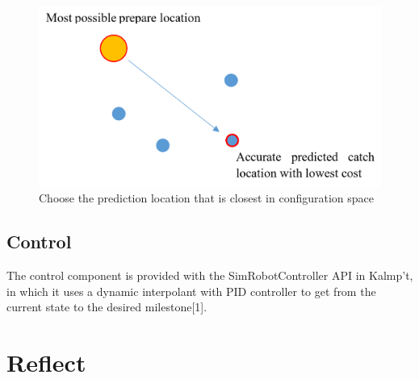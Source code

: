 \documentclass[a4paper]{article}
\begin{document}
\begin{figure}[h]
\centering
\includegraphics[scale=0.9]{bestCatch.PNG}
\caption{Choose the prediction location that is closest in configuration space}
\end{figure}
\subsection{Control}
The control component is provided with the SimRobotController API in Kalmp't, in which it uses a dynamic interpolant with PID controller to get from the current state to the desired milestone[1]. 
\pagebreak
\section{Reflect}
\end{document}

